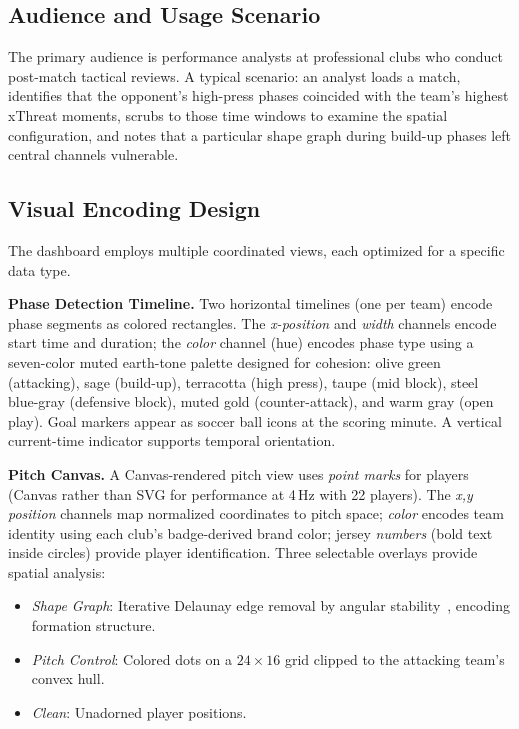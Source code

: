\documentclass{vgtc}                          %
\begin{document}
\subsection{Audience and Usage Scenario}

The primary audience is performance analysts at professional clubs who conduct post-match tactical reviews. A typical scenario: an analyst loads a match, identifies that the opponent's high-press phases coincided with the team's highest xThreat moments, scrubs to those time windows to examine the spatial configuration, and notes that a particular shape graph during build-up phases left central channels vulnerable.

\subsection{Visual Encoding Design}

The dashboard employs multiple coordinated views, each optimized for a specific data type.

\textbf{Phase Detection Timeline.} Two horizontal timelines (one per team) encode phase segments as colored rectangles. The \emph{x-position} and \emph{width} channels encode start time and duration; the \emph{color} channel (hue) encodes phase type using a seven-color muted earth-tone palette designed for cohesion: olive green (attacking), sage (build-up), terracotta (high press), taupe (mid block), steel blue-gray (defensive block), muted gold (counter-attack), and warm gray (open play). Goal markers appear as soccer ball icons at the scoring minute. A vertical current-time indicator supports temporal orientation.

\textbf{Pitch Canvas.} A Canvas-rendered pitch view uses \emph{point marks} for players (Canvas rather than SVG for performance at 4\,Hz with 22 players). The \emph{x,y position} channels map normalized coordinates to pitch space; \emph{color} encodes team identity using each club's badge-derived brand color; jersey \emph{numbers} (bold text inside circles) provide player identification. Three selectable overlays provide spatial analysis:
\begin{itemize}
  \item \emph{Shape Graph}: Iterative Delaunay edge removal by angular stability~\cite{brandes2025}, encoding formation structure.
  \item \emph{Pitch Control}: Colored dots on a $24{\times}16$ grid clipped to the attacking team's convex hull.
  \item \emph{Clean}: Unadorned player positions.
\end{itemize}
\end{document}
